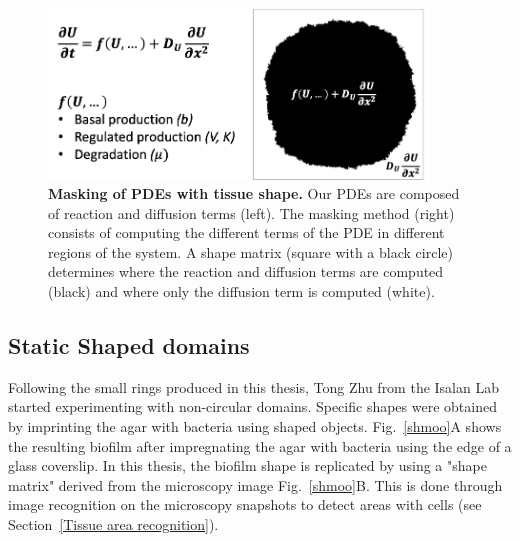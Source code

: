 \begin{figure}[H]
    \centering

    \includegraphics[width=0.9\textwidth]{chapters/Chapter 3/mask}
    \caption{\textbf{Masking of PDEs with tissue shape.} Our PDEs are composed of reaction and diffusion terms (left). The masking method (right) consists of computing the different terms of the PDE in different regions of the system. A shape matrix (square with a black circle) determines where the reaction and diffusion terms are computed (black) and where only the diffusion term is computed (white).}
    \label{mask}
\end{figure}

\subsection{Static Shaped domains}
Following the small rings produced in this thesis, Tong Zhu from the Isalan Lab started experimenting with non-circular domains.
Specific shapes were obtained by imprinting the agar with bacteria using shaped objects.
Fig.~\ref{shmoo}A shows the resulting biofilm after impregnating the agar with bacteria using the edge of a glass coverslip.
In this thesis, the biofilm shape is replicated by using a "shape matrix" derived from the microscopy image Fig.~\ref{shmoo}B.
This is done through image recognition on the microscopy snapshots to detect areas with cells (see Section~\ref{Tissue area recognition}).


